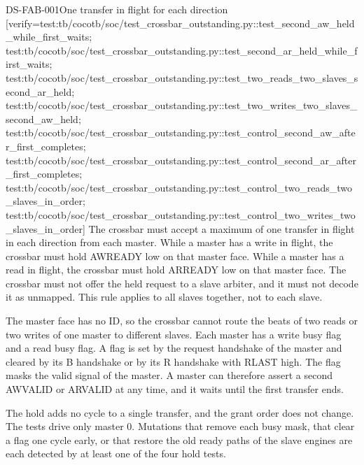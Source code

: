 \begin{requirement}{DS-FAB-001}{One transfer in flight for each direction}
[verify={test:tb/cocotb/soc/test_crossbar_outstanding.py::test_second_aw_held_while_first_waits; test:tb/cocotb/soc/test_crossbar_outstanding.py::test_second_ar_held_while_first_waits; test:tb/cocotb/soc/test_crossbar_outstanding.py::test_two_reads_two_slaves_second_ar_held; test:tb/cocotb/soc/test_crossbar_outstanding.py::test_two_writes_two_slaves_second_aw_held; test:tb/cocotb/soc/test_crossbar_outstanding.py::test_control_second_aw_after_first_completes; test:tb/cocotb/soc/test_crossbar_outstanding.py::test_control_second_ar_after_first_completes; test:tb/cocotb/soc/test_crossbar_outstanding.py::test_control_two_reads_two_slaves_in_order; test:tb/cocotb/soc/test_crossbar_outstanding.py::test_control_two_writes_two_slaves_in_order}]
The crossbar must accept a maximum of one transfer in flight in each direction from each master. While a master has a write in flight, the crossbar must hold AWREADY low on that master face. While a master has a read in flight, the crossbar must hold ARREADY low on that master face. The crossbar must not offer the held request to a slave arbiter, and it must not decode it as unmapped. This rule applies to all slaves together, not to each slave.
\end{requirement}
\begin{rationale}
The master face has no ID, so the crossbar cannot route the beats of two reads or two writes of one master to different slaves. Each master has a write busy flag and a read busy flag. A flag is set by the request handshake of the master and cleared by its B handshake or by its R handshake with RLAST high. The flag masks the valid signal of the master. A master can therefore assert a second AWVALID or ARVALID at any time, and it waits until the first transfer ends.
\end{rationale}
\begin{information}
The hold adds no cycle to a single transfer, and the grant order does not change. The tests drive only master 0. Mutations that remove each busy mask, that clear a flag one cycle early, or that restore the old ready paths of the slave engines are each detected by at least one of the four hold tests.
\end{information}

